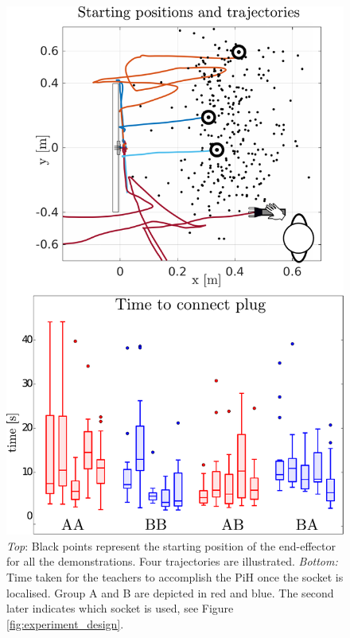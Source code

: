 \begin{figure}
 \centering
   \includegraphics[width=\textwidth]{./ch4-PiH/Figures/Fig/start_position_v2.pdf}
   \caption{\textit{Top}: Black points represent the starting position of the end-effector
   for all the demonstrations. Four trajectories are illustrated. \textit{Bottom:} 
   Time taken for the teachers to accomplish the PiH once the socket is localised. Group A and B are depicted in red 
   and blue. The second later indicates which socket is used, see Figure \ref{fig:experiment_design}.}
   
  \label{fig:experiment_setup_data}
\end{figure}

